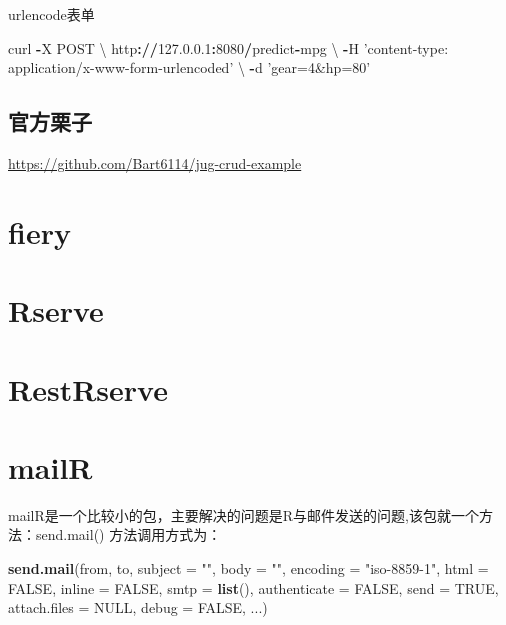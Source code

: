 \documentclass[]{book}
\newenvironment{Shaded}{\begin{snugshade}}{\end{snugshade}}
\newcommand{\KeywordTok}[1]{\textcolor[rgb]{0.13,0.29,0.53}{\textbf{#1}}}
\newcommand{\DataTypeTok}[1]{\textcolor[rgb]{0.13,0.29,0.53}{#1}}
\newcommand{\DecValTok}[1]{\textcolor[rgb]{0.00,0.00,0.81}{#1}}
\newcommand{\FloatTok}[1]{\textcolor[rgb]{0.00,0.00,0.81}{#1}}
\newcommand{\StringTok}[1]{\textcolor[rgb]{0.31,0.60,0.02}{#1}}
\newcommand{\OtherTok}[1]{\textcolor[rgb]{0.56,0.35,0.01}{#1}}
\newcommand{\OperatorTok}[1]{\textcolor[rgb]{0.81,0.36,0.00}{\textbf{#1}}}
\newcommand{\ErrorTok}[1]{\textcolor[rgb]{0.64,0.00,0.00}{\textbf{#1}}}
\newcommand{\NormalTok}[1]{#1}
\begin{document}
urlencode表单

\begin{Shaded}
\begin{Highlighting}[]
\NormalTok{curl }\OperatorTok{-}\NormalTok{X POST \textbackslash{}}
\NormalTok{  http}\OperatorTok{:}\ErrorTok{//}\FloatTok{127.0}\NormalTok{.}\FloatTok{0.1}\OperatorTok{:}\DecValTok{8080}\OperatorTok{/}\NormalTok{predict}\OperatorTok{-}\NormalTok{mpg \textbackslash{}}
  \OperatorTok{-}\NormalTok{H }\StringTok{'content-type: application/x-www-form-urlencoded'}\NormalTok{ \textbackslash{}}
  \OperatorTok{-}\NormalTok{d }\StringTok{'gear=4&hp=80'}
\end{Highlighting}
\end{Shaded}

\section{官方栗子}

\url{https://github.com/Bart6114/jug-crud-example}

\chapter{fiery}\label{fiery}

\chapter{Rserve}\label{rserve}

\chapter{RestRserve}\label{restrserve}

\chapter{mailR}\label{mailr}

mailR是一个比较小的包，主要解决的问题是R与邮件发送的问题,该包就一个方法：send.mail()
方法调用方式为：

\begin{Shaded}
\begin{Highlighting}[]
\KeywordTok{send.mail}\NormalTok{(from, to, }\DataTypeTok{subject =} \StringTok{""}\NormalTok{, }\DataTypeTok{body =} \StringTok{""}\NormalTok{, }\DataTypeTok{encoding =} \StringTok{"iso-8859-1"}\NormalTok{,}
\DataTypeTok{html =} \OtherTok{FALSE}\NormalTok{, }\DataTypeTok{inline =} \OtherTok{FALSE}\NormalTok{, }\DataTypeTok{smtp =} \KeywordTok{list}\NormalTok{(), }\DataTypeTok{authenticate =} \OtherTok{FALSE}\NormalTok{,}
\DataTypeTok{send =} \OtherTok{TRUE}\NormalTok{, }\DataTypeTok{attach.files =} \OtherTok{NULL}\NormalTok{, }\DataTypeTok{debug =} \OtherTok{FALSE}\NormalTok{, ...)}
\end{Highlighting}
\end{Shaded}
\end{document}
